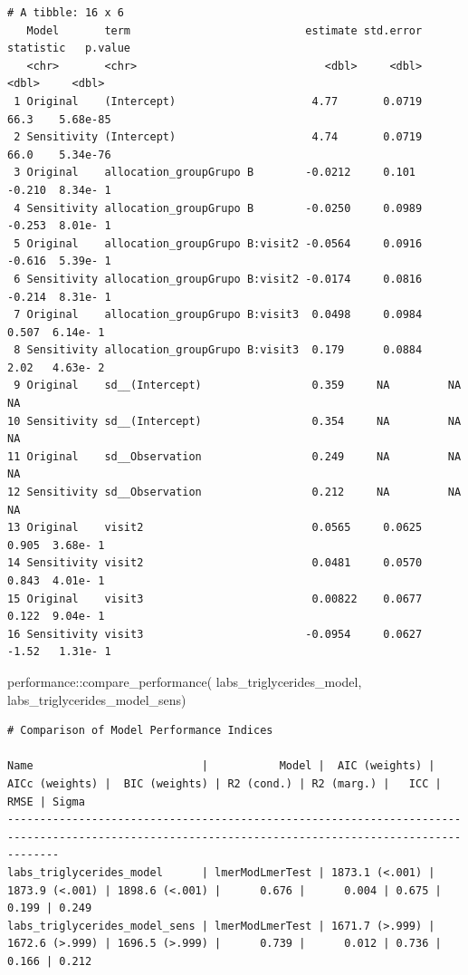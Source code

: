 \documentclass[
  12pt,
]{article}
\newenvironment{Shaded}{\begin{snugshade}}{\end{snugshade}}
\newcommand{\FunctionTok}[1]{\textcolor[rgb]{0.28,0.35,0.67}{#1}}
\newcommand{\NormalTok}[1]{\textcolor[rgb]{0.00,0.23,0.31}{#1}}
\newcommand{\SpecialCharTok}[1]{\textcolor[rgb]{0.37,0.37,0.37}{#1}}
\begin{document}
\begin{verbatim}
# A tibble: 16 x 6
   Model       term                           estimate std.error statistic   p.value
   <chr>       <chr>                             <dbl>     <dbl>     <dbl>     <dbl>
 1 Original    (Intercept)                     4.77       0.0719    66.3    5.68e-85
 2 Sensitivity (Intercept)                     4.74       0.0719    66.0    5.34e-76
 3 Original    allocation_groupGrupo B        -0.0212     0.101     -0.210  8.34e- 1
 4 Sensitivity allocation_groupGrupo B        -0.0250     0.0989    -0.253  8.01e- 1
 5 Original    allocation_groupGrupo B:visit2 -0.0564     0.0916    -0.616  5.39e- 1
 6 Sensitivity allocation_groupGrupo B:visit2 -0.0174     0.0816    -0.214  8.31e- 1
 7 Original    allocation_groupGrupo B:visit3  0.0498     0.0984     0.507  6.14e- 1
 8 Sensitivity allocation_groupGrupo B:visit3  0.179      0.0884     2.02   4.63e- 2
 9 Original    sd__(Intercept)                 0.359     NA         NA     NA       
10 Sensitivity sd__(Intercept)                 0.354     NA         NA     NA       
11 Original    sd__Observation                 0.249     NA         NA     NA       
12 Sensitivity sd__Observation                 0.212     NA         NA     NA       
13 Original    visit2                          0.0565     0.0625     0.905  3.68e- 1
14 Sensitivity visit2                          0.0481     0.0570     0.843  4.01e- 1
15 Original    visit3                          0.00822    0.0677     0.122  9.04e- 1
16 Sensitivity visit3                         -0.0954     0.0627    -1.52   1.31e- 1
\end{verbatim}

\begin{Shaded}
\begin{Highlighting}[]
\NormalTok{performance}\SpecialCharTok{::}\FunctionTok{compare\_performance}\NormalTok{(}
\NormalTok{    labs\_triglycerides\_model, }
\NormalTok{    labs\_triglycerides\_model\_sens) }
\end{Highlighting}
\end{Shaded}

\begin{verbatim}
# Comparison of Model Performance Indices

Name                          |           Model |  AIC (weights) | AICc (weights) |  BIC (weights) | R2 (cond.) | R2 (marg.) |   ICC |  RMSE | Sigma
----------------------------------------------------------------------------------------------------------------------------------------------------
labs_triglycerides_model      | lmerModLmerTest | 1873.1 (<.001) | 1873.9 (<.001) | 1898.6 (<.001) |      0.676 |      0.004 | 0.675 | 0.199 | 0.249
labs_triglycerides_model_sens | lmerModLmerTest | 1671.7 (>.999) | 1672.6 (>.999) | 1696.5 (>.999) |      0.739 |      0.012 | 0.736 | 0.166 | 0.212
\end{verbatim}
\end{document}
